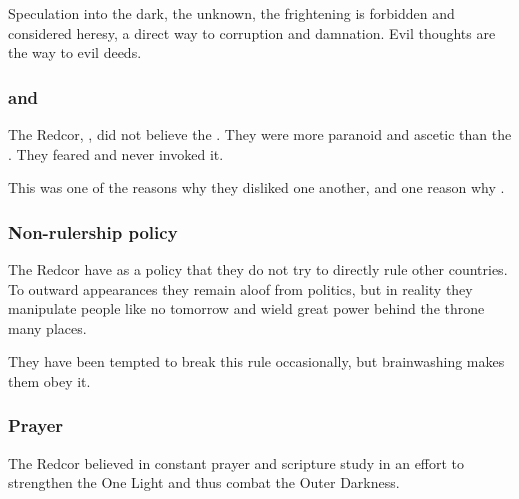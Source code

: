Speculation into the dark, the unknown, the frightening is forbidden and considered heresy, a direct way to corruption and damnation. Evil thoughts are the way to evil deeds.





\subsubsection{\Iquin and \Itzach}
The Redcor, , did not believe the . 
They were more paranoid and ascetic than the \Telcras. 
They feared \itzach and never invoked it. 

This was one of the reasons why they disliked one another, and one reason why .





\subsubsection{Non-rulership policy}
The Redcor have as a policy that they do not try to directly rule other countries. 
To outward appearances they remain aloof from politics, but in reality they manipulate people like no tomorrow and wield great power behind the throne many places. 

They have been tempted to break this rule occasionally, but \sephirah{} brainwashing makes them obey it. 





\subsubsection{Prayer}
The Redcor believed in constant prayer and scripture study in an effort to strengthen the One Light and thus combat the Outer Darkness. 

